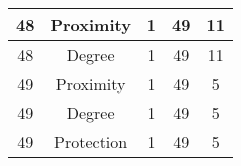 \documentclass[results.tex]{subfiles}
\begin{document}
\begin{center}
\begin{tabular}{| c || c | c | c | c |}
            \hline
            48                      & Proximity                    & 1                      & 49                      & 11                   \\
            \hline
            48                      & Degree                       & 1                      & 49                      & 11                   \\
            \hline
            49                      & Proximity                    & 1                      & 49                      & 5                    \\
            \hline
            49                      & Degree                       & 1                      & 49                      & 5                    \\
            \hline
            49                      & Protection                   & 1                      & 49                      & 5                    \\
            \hline
        \end{tabular}
    \end{center}
\end{document}
